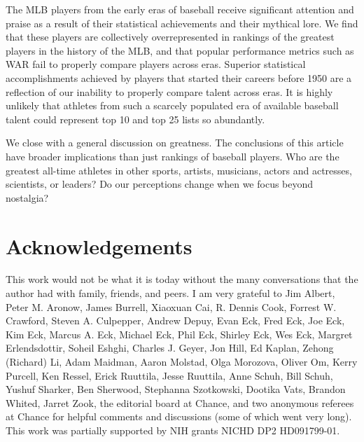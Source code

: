 \documentclass[11pt]{article}\usepackage[]{graphicx}\usepackage[]{color}
\begin{document}

The MLB players from the early eras of baseball receive significant attention 
and praise as a result of their statistical achievements and their mythical 
lore.  We find that these players are collectively overrepresented in 
rankings of the greatest players in the history of the MLB, and that popular 
performance metrics such as WAR fail to properly compare players across eras.  
Superior statistical accomplishments achieved 
by players that started their careers before 1950 are a reflection of our 
inability to properly compare talent across eras.  It is highly unlikely that 
athletes from such a scarcely populated era of available baseball talent 
could represent top 10 and top 25 lists so abundantly. 

We close with a general discussion on greatness.  The conclusions of this 
article have broader implications than just rankings of baseball players.  
Who are the greatest all-time athletes in other sports, 
artists, 
musicians, 
actors and actresses,
scientists, or 
leaders?  Do our perceptions change when we focus beyond nostalgia?  

\section*{Acknowledgements}
This work would not be what it is today without the many conversations that 
the author had with family, friends, and peers.
I am very grateful to 
Jim Albert, 
Peter M. Aronow, 
James Burrell, 
Xiaoxuan Cai, 
R. Dennis Cook, 
Forrest W. Crawford, 
Steven A. Culpepper, 
Andrew Depuy, 
Evan Eck, 
Fred Eck, 
Joe Eck, 
Kim Eck, 
Marcus A. Eck, 
Michael Eck, 
Phil Eck, 
Shirley Eck, 
Wes Eck, 
Margret Erlendsdottir, 
Soheil Eshghi, 
Charles J. Geyer, 
Jon Hill,
Ed Kaplan, 
Zehong (Richard) Li, 
Adam Maidman, 
Aaron Molstad, 
Olga Morozova, 
Oliver Om, 
Kerry Purcell, 
Ken Ressel, 
Erick Ruuttila, 
Jesse Ruuttila, 
Anne Schuh, 
Bill Schuh, 
Yushuf Sharker, 
Ben Sherwood, 
Stephanna Szotkowski,
Dootika Vats,
Brandon Whited,
Jarret Zook,
the editorial board at Chance, 
and 
two anonymous referees at Chance
for helpful comments and discussions (some of which went very long).
This work was partially supported by NIH grants NICHD DP2 HD091799-01.
\end{document}
